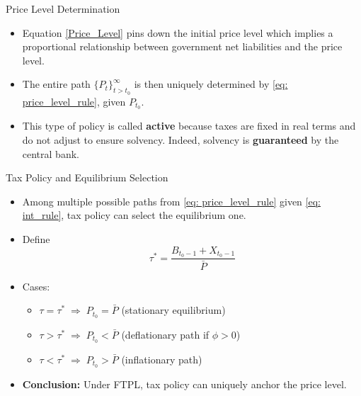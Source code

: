 \documentclass[11pt,aspectratio=169]{beamer}
\begin{document}
\begin{frame}{Price Level Determination}
\begin{itemize}
    \item Equation \eqref{Price_Level} pins down the initial price level which implies a proportional relationship between government net liabilities and the price level.
    \vspace{0.25cm}
    
    \item The entire path $\{P_t\}_{t>t_0}^\infty$ is then uniquely determined by \eqref{eq: price_level_rule}, given $P_{t_0}$.
    \vspace{0.5cm}
\item This type of policy is called \textbf{active} because taxes are fixed in real terms and do not adjust to ensure solvency. Indeed, solvency is \textbf{guaranteed} by the central bank.
\end{itemize}

\end{frame}

\begin{frame}{Tax Policy and Equilibrium Selection}
\begin{itemize}
    \item Among multiple possible paths from \eqref{eq: price_level_rule} given \eqref{eq: int_rule}, tax policy can select the equilibrium one.
    \item Define
    \[
    \tau^* = \frac{B_{t_0-1} + X_{t_0-1}}{\bar P}
    \]
    \item Cases:
    \begin{itemize}
        \item $\tau = \tau^* \;\Rightarrow\; P_{t_0} = \bar P$ (stationary equilibrium)
        \item $\tau > \tau^* \;\Rightarrow\; P_{t_0} < \bar P$ (deflationary path if $\phi > 0$)
        \item $\tau < \tau^* \;\Rightarrow\; P_{t_0} > \bar P$ (inflationary path)
    \end{itemize}
    \item \textbf{Conclusion:} Under FTPL, tax policy can uniquely anchor the price level.
\end{itemize}
\end{frame}
\end{document}

